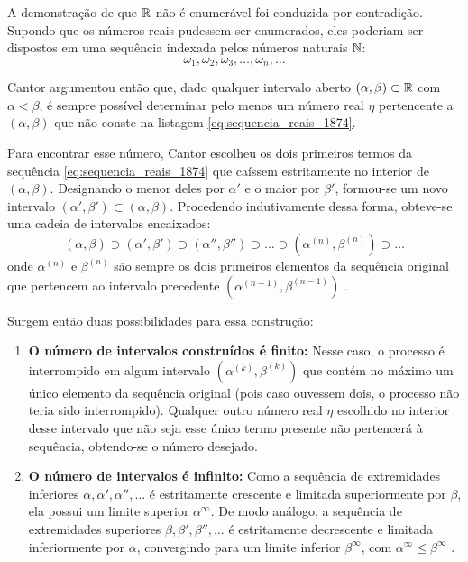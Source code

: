 A demonstração de que \(\mathbb{R}\) não é enumerável foi conduzida por contradição. Supondo que os números reais pudessem ser enumerados, eles poderiam ser dispostos em uma sequência indexada pelos números naturais \(\mathbb{N}\):
\begin{equation}
    \omega_1, \omega_2, \omega_3, \dots, \omega_n, \dots
    \label{eq:sequencia_reais_1874}
\end{equation}

Cantor argumentou então que, dado qualquer intervalo aberto \((\alpha, \beta) \subset \mathbb{R}\) com \(\alpha < \beta\), é sempre possível determinar pelo menos um número real \(\eta\) pertencente a \((\alpha, \beta)\) que não conste na listagem \eqref{eq:sequencia_reais_1874}.

Para encontrar esse número, Cantor escolheu os dois primeiros termos da sequência \eqref{eq:sequencia_reais_1874} que caíssem estritamente no interior de \((\alpha, \beta)\). Designando o menor deles por \(\alpha'\) e o maior por \(\beta'\), formou-se um novo intervalo \((\alpha', \beta') \subset (\alpha, \beta)\). Procedendo indutivamente dessa forma, obteve-se uma cadeia de intervalos encaixados:
\[
    (\alpha, \beta) \supset (\alpha', \beta') \supset (\alpha'', \beta'') \supset \dots \supset (\alpha^{(n)}, \beta^{(n)}) \supset \dots
\]
onde \(\alpha^{(n)}\) e \(\beta^{(n)}\) são sempre os dois primeiros elementos da sequência original que pertencem ao intervalo precedente \((\alpha^{(n-1)}, \beta^{(n-1)})\) \parencite[p.~51]{dauben1990}.

Surgem então duas possibilidades para essa construção:
\begin{enumerate}
    \item \textbf{O número de intervalos construídos é finito:} Nesse caso, o processo é interrompido em algum intervalo \((\alpha^{(k)}, \beta^{(k)})\) que contém no máximo um único elemento da sequência original (pois caso ouvessem dois, o processo não teria sido interrompido). Qualquer outro número real \(\eta\) escolhido no interior desse intervalo que não seja esse único termo presente não pertencerá à sequência, obtendo-se o número desejado.
    \item \textbf{O número de intervalos é infinito:} Como a sequência de extremidades inferiores \(\alpha, \alpha', \alpha'', \dots\) é estritamente crescente e limitada superiormente por \(\beta\), ela possui um limite superior \(\alpha^\infty\). De modo análogo, a sequência de extremidades superiores \(\beta, \beta', \beta'', \dots\) é estritamente decrescente e limitada inferiormente por \(\alpha\), convergindo para um limite inferior \(\beta^\infty\), com \(\alpha^\infty \leq \beta^\infty\) \parencite[p.~51]{dauben1990}.
\end{enumerate}

